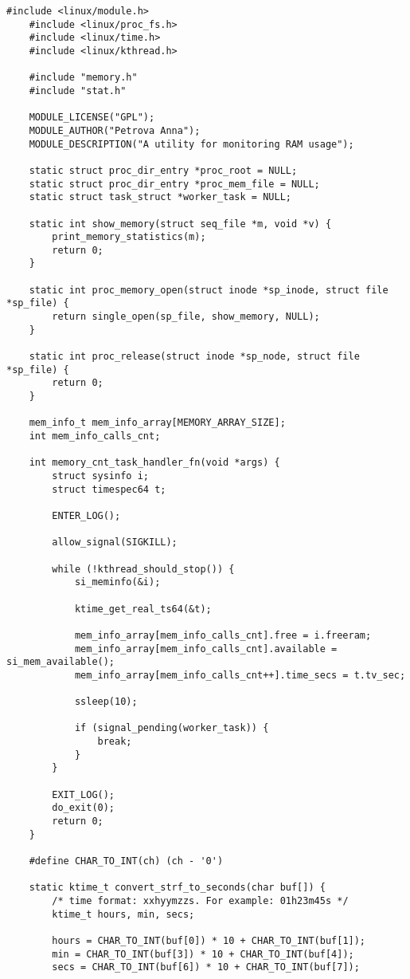 
\begin{lstlisting}[caption={листинг файла monitor\_main.c}]
	#include <linux/module.h>
	#include <linux/proc_fs.h> 
	#include <linux/time.h>
	#include <linux/kthread.h>
	
	#include "memory.h"
	#include "stat.h"
	
	MODULE_LICENSE("GPL");
	MODULE_AUTHOR("Petrova Anna");
	MODULE_DESCRIPTION("A utility for monitoring RAM usage");
	
	static struct proc_dir_entry *proc_root = NULL;
	static struct proc_dir_entry *proc_mem_file = NULL;
	static struct task_struct *worker_task = NULL;
	
	static int show_memory(struct seq_file *m, void *v) {
		print_memory_statistics(m);
		return 0;
	}
	
	static int proc_memory_open(struct inode *sp_inode, struct file *sp_file) {
		return single_open(sp_file, show_memory, NULL);
	}
	
	static int proc_release(struct inode *sp_node, struct file *sp_file) {
		return 0;
	}
	
	mem_info_t mem_info_array[MEMORY_ARRAY_SIZE];
	int mem_info_calls_cnt;
	
	int memory_cnt_task_handler_fn(void *args) {
		struct sysinfo i;
		struct timespec64 t;
		
		ENTER_LOG();
		
		allow_signal(SIGKILL);
		
		while (!kthread_should_stop()) {
			si_meminfo(&i);
			
			ktime_get_real_ts64(&t);
			
			mem_info_array[mem_info_calls_cnt].free = i.freeram;
			mem_info_array[mem_info_calls_cnt].available = si_mem_available();
			mem_info_array[mem_info_calls_cnt++].time_secs = t.tv_sec;
			
			ssleep(10);
			
			if (signal_pending(worker_task)) {
				break;
			}
		}
		
		EXIT_LOG();
		do_exit(0);
		return 0;
	}
	
	#define CHAR_TO_INT(ch) (ch - '0')
	
	static ktime_t convert_strf_to_seconds(char buf[]) {
		/* time format: xxhyymzzs. For example: 01h23m45s */
		ktime_t hours, min, secs;
		
		hours = CHAR_TO_INT(buf[0]) * 10 + CHAR_TO_INT(buf[1]);
		min = CHAR_TO_INT(buf[3]) * 10 + CHAR_TO_INT(buf[4]);
		secs = CHAR_TO_INT(buf[6]) * 10 + CHAR_TO_INT(buf[7]);
		

\end{lstlisting}
